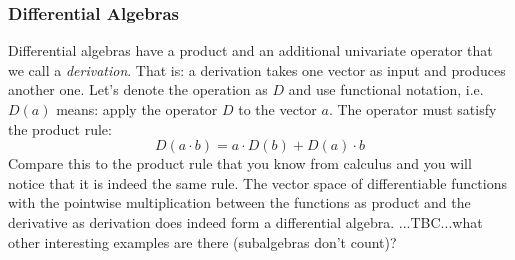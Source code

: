 \subsubsection{Differential Algebras} 
Differential algebras have a product and an additional univariate operator that we call a \emph{derivation}. That is: a derivation takes one vector as input and produces another one. Let's denote the operation as $D$ and use functional notation, i.e. $D(a)$ means: apply the operator $D$ to the vector $a$. The operator must satisfy the product rule:
\begin{equation}
 D(a \cdot b) = a \cdot D(b) + D(a) \cdot b
\end{equation}
Compare this to the product rule that you know from calculus and you will notice that it is indeed the same rule. The vector space of differentiable functions with the pointwise multiplication between the functions as product and the derivative as derivation does indeed form a differential algebra. ...TBC...what other interesting examples are there (subalgebras don't count)?




